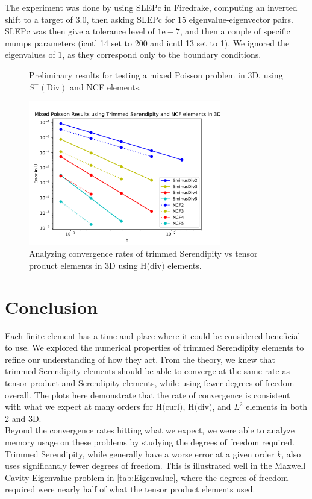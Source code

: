 \documentclass[manuscript,screen]{acmart}
\begin{document}
\noindent The experiment was done by using SLEPc in Firedrake, computing an inverted shift to a target of $3.0$, then asking SLEPc for $15$ eigenvalue-eigenvector pairs.  SLEPc was then give a tolerance level of $1\text{e}-7$, and then a couple of specific mumps parameters (icntl 14 set to 200 and icntl 13 set to 1).  We ignored the eigenvalues of $1$, as they correspond only to the boundary conditions. 
  


\begin{figure}[h]
  \caption{Preliminary results for testing a mixed Poisson problem in 3D, using $S^-(\text{Div})$ and NCF elements.}
  \includegraphics[width=0.75\textwidth]{3dMixedPoissonH.pdf}
\caption{Analyzing convergence rates of trimmed Serendipity vs tensor product elements in 3D using H$($div$)$ elements.}
\label{fig:3dTrimmedDivN}
\end{figure}

\section{Conclusion}

Each finite element has a time and place where it could be considered beneficial to use.  We explored the numerical properties of trimmed Serendipity elements to refine our understanding of how they act.  From the theory, we knew that trimmed Serendipity elements should be able to converge at the same rate as tensor product and Serendipity elements, while using fewer degrees of freedom overall.  The plots here demonstrate that the rate of convergence is consistent with what we expect at many orders for H$($curl$)$, H$($div$)$, and $L^2$ elements in both 2 and 3D.\\

\noindent Beyond the convergence rates hitting what we expect, we were able to analyze memory usage on these problems by studying the degrees of freedom required.  Trimmed Serendipity, while generally have a worse error at a given order $k$, also uses significantly fewer degrees of freedom.  This is illustrated well in the Maxwell Cavity Eigenvalue problem in \ref{tab:Eigenvalue}, where the degrees of freedom required were nearly half of what the tensor product elements used.  \\
\end{document}
